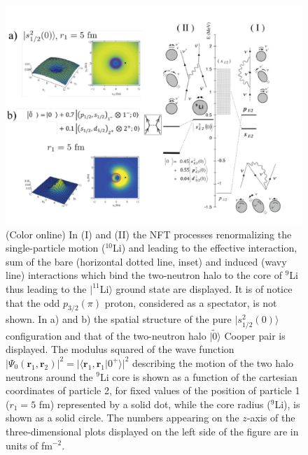   \begin{figure}
  \centerline{\includegraphics*[width=\textwidth,angle=0]{nutshell/figs/fig1F3.pdf}}
  \caption[NFT processes renormalizing the single-particle motion in $^{10}$Li.]{(Color online) In (I) and (II) the NFT processes renormalizing the single-particle motion ($^{10}$Li) and leading to the effective interaction, sum of the bare (horizontal dotted line, inset) and induced (wavy line) interactions which bind the two-neutron halo to the core of $^{9}$Li  thus leading to the $|^{11}$Li$\rangle$ ground state are displayed. It is of notice that the odd $p_{3/2}(\pi)$ proton, considered as a spectator, is not shown. In a) and b)  the  spatial structure of the pure $|s_{1/2}^2(0)\rangle$ configuration and that of the two-neutron halo $|\tilde 0\rangle$ Cooper pair is displayed. The modulus squared of the wave function $|\Psi_0(\mathbf{r}_1,\mathbf{r}_2)|^2=|\langle \mathbf{r}_1,\mathbf{r}_1|0^+\rangle|^2$ describing the motion of the two halo neutrons around the $^9$Li core 
  is shown as a function of the cartesian coordinates of particle 2, for fixed values of the
  position of particle 1 ($r_1 = 5$ fm) represented  by a solid dot, while the core radius ($^9$Li), is shown as a solid
  circle. The numbers appearing on the $z$-axis of the three-dimensional plots displayed on the left side of the figure are in units of fm$^{-2}$.}\label{fig1F3}
  \end{figure}
\FloatBarrier 
 
 

